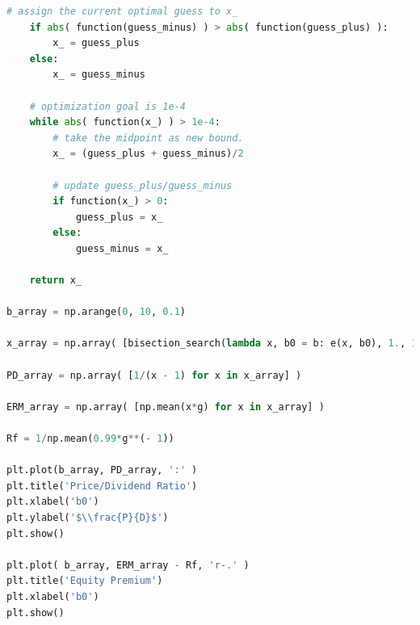\documentclass{article}
\begin{document}
\begin{lstlisting}[language=Python, caption=Python Code]
	# assign the current optimal guess to x_
	if abs( function(guess_minus) ) > abs( function(guess_plus) ):
		x_ = guess_plus
	else:
		x_ = guess_minus
	
	# optimization goal is 1e-4
	while abs( function(x_) ) > 1e-4:
		# take the midpoint as new bound.
		x_ = (guess_plus + guess_minus)/2
		
		# update guess_plus/guess_minus
		if function(x_) > 0:
			guess_plus = x_ 
		else:
			guess_minus = x_
	
	return x_

b_array = np.arange(0, 10, 0.1)

x_array = np.array( [bisection_search(lambda x, b0 = b: e(x, b0), 1., 1.1 ) for b in b_array ] )

PD_array = np.array( [1/(x - 1) for x in x_array] )

ERM_array = np.array( [np.mean(x*g) for x in x_array] )

Rf = 1/np.mean(0.99*g**(- 1))

plt.plot(b_array, PD_array, ':' )
plt.title('Price/Dividend Ratio')
plt.xlabel('b0')
plt.ylabel('$\\frac{P}{D}$')
plt.show()

plt.plot( b_array, ERM_array - Rf, 'r-.' )
plt.title('Equity Premium')
plt.xlabel('b0')
plt.show()
\end{lstlisting}
\end{document}
